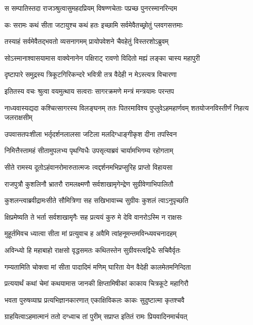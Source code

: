 \twolineshloka
{स सम्पातिस्तदा राजञ्श्रुत्वासुमहदप्रियम्}
{विषण्णचेताः पप्रच्छ पुनरस्मानरिन्दम}


\twolineshloka
{कः सरामः कथं सीता जटायुश्च कथं हतः}
{इच्छामि सर्वमेवैतच्छ्रोतुं प्लवगसत्तमाः}


\twolineshloka
{तस्याहं सर्वमेवैतद्भवतो व्यसनागमम्}
{प्रायोपवेशने चैवहेतुं विस्तरशोऽब्रुवम्}


\twolineshloka
{सोऽस्मानाश्वासयामास वाक्येनानेन पक्षिराट्}
{रावणो विदितो मह्यं लङ्का चास्य महापुरी}


\twolineshloka
{दृष्टापारे समुद्रस्य त्रिकूटगिरिकन्दरे}
{भवित्री तत्र वैदेही न मेऽस्त्यत्र विचारणा}


\twolineshloka
{इतितस्य वचः श्रुत्वा वयमुत्थाय सत्वराः}
{सागरक्रमणे मन्त्रं मन्त्रयामः परन्तप}


\threelineshloka
{नाध्यवास्यद्यदा कश्चित्सागरस्य विलङ्घनम्}
{ततः पितरमाविश्य पुप्लुवेऽहमहार्णवम्}
{शतयोजनविस्तीर्णं निहत्य जलराक्षसीम्}


\twolineshloka
{उपवासतपःशीला भर्तृदर्शनलालसा}
{जटिला मलदिग्धाङ्गीकृश दीना तपस्विन}


\twolineshloka
{निमित्तैस्तामहं सीतामुपलभ्य पृथग्विधैः}
{उपसृत्याब्रवं चार्यामभिगम्य रहोगताम्}


\twolineshloka
{सीते रामस्य दूतोऽहंवानरोमारुतात्मजः}
{त्वद्दर्शनमभिप्रप्सुरिह प्राप्तो विहायसा}


\twolineshloka
{राजपुत्रौ कुशलिनौ भ्रातरौ रामलक्ष्मणौ}
{सर्वशाखामृगेन्द्रेण सुग्रीवेणाभिपालितौ}


\twolineshloka
{कुशलन्त्वाब्रवीद्रामःसीते सौमित्रिणा सह}
{सखिभावाच्च सुग्रीवः कुशलं त्वाऽनुपृच्छति}


\twolineshloka
{क्षिप्रमेष्यति ते भर्ता सर्वशाखामृगैः सह}
{प्रत्ययं कुरु मे देवि वानरोऽस्मि न राक्षसः}


\twolineshloka
{मुहूर्तमिवच ध्यात्वा सीता मां प्रत्युवाच ह}
{अवैमि त्वांहनूमन्तमविन्ध्यवचनादहम्}


\twolineshloka
{अविन्ध्यो हि महाबाहो राक्षसो वृद्धसमतः}
{कथितस्तेन सुग्रीवस्त्वद्विधैः सचिवैर्वृतः}


\twolineshloka
{गम्यतामिति चोक्त्वा मां सीता पादादिमं मणिम्}
{घारिता येन वैदेही कालमेतमनिन्दिता}


\twolineshloka
{प्रत्ययार्थं कथां चेमां कथयामास जानकी}
{क्षिप्तामिषीकां काकाय चित्रकूटे महागिरौ}


\twolineshloka
{भवता पुरुषव्याघ्र प्रत्यभिज्ञानकारणात्}
{एकाक्षिविकलः काकः सुदुष्टात्मा कृतश्चवै}


\twolineshloka
{ग्राहयित्वाऽहमात्मानं ततो दग्ध्वाच तां पुरीम्}
{सप्राप्त इतितं रामः प्रियवादिनमार्चयत्}


